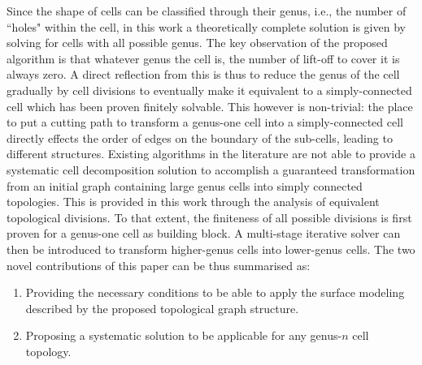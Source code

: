 \documentclass[journal]{IEEEtran}
\begin{document}

Since the shape of cells can be classified through their genus, i.e., the number of ``holes" within the cell, in this work a 
theoretically complete solution is given by solving for cells with all possible genus. The key observation of the proposed algorithm is that 
whatever genus the cell is, the number of lift-off to cover it is always zero. %
A direct reflection from this is thus to reduce the genus of the cell gradually by cell divisions to eventually make it equivalent to a 
simply-connected cell which has been proven finitely solvable. This however is non-trivial: the place to put a cutting path to transform 
a genus-one cell into a simply-connected cell directly effects the order of edges on the boundary of the sub-cells, leading to different structures. %
Existing algorithms in the literature are not able to provide a systematic cell decomposition solution to accomplish a guaranteed 
transformation from an initial graph containing large genus cells into simply connected topologies. This is provided in this work through 
the analysis of equivalent topological divisions. To that extent, the finiteness of all possible divisions is first proven for a genus-one cell as 
building block. A multi-stage iterative solver can then be introduced to transform higher-genus cells into lower-genus cells. The two novel 
contributions of this paper can be thus summarised as:
\begin{enumerate}
\item Providing the necessary conditions to be able to apply the surface modeling described by the proposed topological graph structure. %
\item Proposing a systematic solution to be applicable for any genus-$n$ cell topology. 
\end{enumerate}
\end{document}
